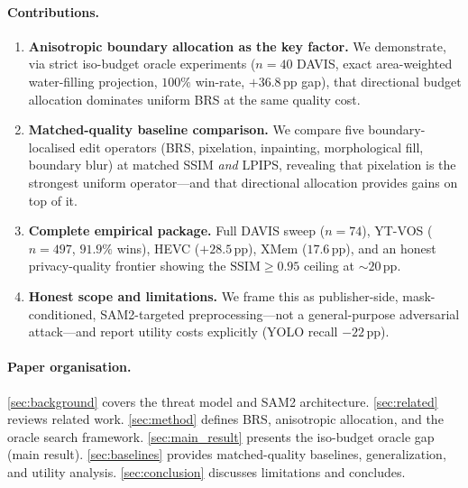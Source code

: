 \paragraph{Contributions.}
\begin{enumerate}
  \item \textbf{Anisotropic boundary allocation as the key factor.}
  We demonstrate, via strict iso-budget oracle experiments ($n{=}40$ DAVIS, exact area-weighted water-filling projection, $100\%$ win-rate, $+36.8\,\mathrm{pp}$ gap), that directional budget allocation dominates uniform BRS at the same quality cost.

  \item \textbf{Matched-quality baseline comparison.}
  We compare five boundary-localised edit operators (BRS, pixelation, inpainting, morphological fill, boundary blur) at matched SSIM \emph{and} LPIPS, revealing that pixelation is the strongest uniform operator---and that directional allocation provides gains on top of it.

  \item \textbf{Complete empirical package.}
  Full DAVIS sweep ($n{=}74$), YT-VOS ($n{=}497$, $91.9\%$ wins), HEVC ($+28.5\,\mathrm{pp}$), XMem ($17.6\,\mathrm{pp}$), and an honest privacy-quality frontier showing the $\mathrm{SSIM}{\geq}0.95$ ceiling at ${\sim}20\,\mathrm{pp}$.

  \item \textbf{Honest scope and limitations.}
  We frame this as publisher-side, mask-conditioned, SAM2-targeted preprocessing---not a general-purpose adversarial attack---and report utility costs explicitly (YOLO recall $-22\,\mathrm{pp}$).
\end{enumerate}

\paragraph{Paper organisation.}
\cref{sec:background} covers the threat model and SAM2 architecture.
\cref{sec:related} reviews related work.
\cref{sec:method} defines BRS, anisotropic allocation, and the oracle search framework.
\cref{sec:main_result} presents the iso-budget oracle gap (main result).
\cref{sec:baselines} provides matched-quality baselines, generalization, and utility analysis.
\cref{sec:conclusion} discusses limitations and concludes.
